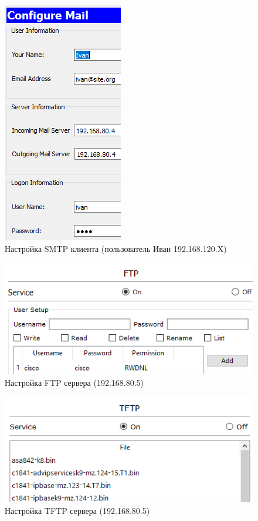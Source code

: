 \begin{figure}[h!]
	\centering
	\includegraphics[scale = 0.76]{images/5_4_2.png}
	\caption{Настройка SMTP клиента (пользователь Иван 192.168.120.X)}
	\label{image:5_4_2}
\end{figure}

\begin{figure}[h!]
	\centering
	\includegraphics[scale = 0.83]{images/5_5.png}
	\caption{Настройка FTP сервера (192.168.80.5)}
	\label{image:5_5}
\end{figure}

\begin{figure}[h!]
	\centering
	\includegraphics[scale = 0.89]{images/5_6.png}
	\caption{Настройка TFTP сервера (192.168.80.5)}
	\label{image:5_6}
\end{figure}

